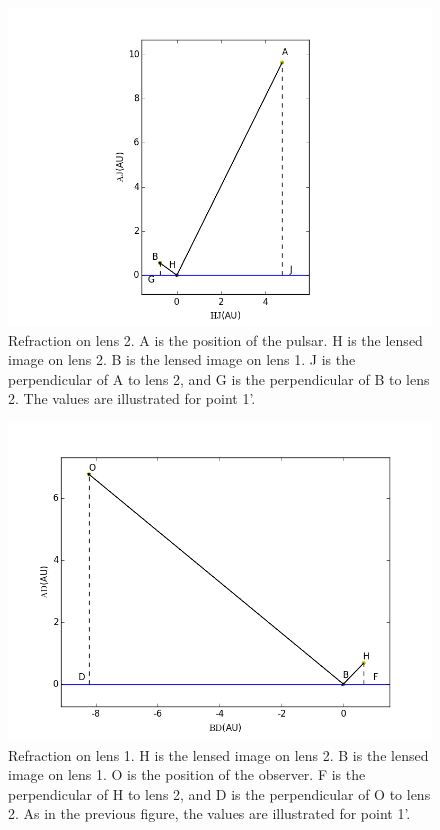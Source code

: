 \documentclass[useAMS,usenatbib]{mn2e}
\begin{document}
\begin{figure}
\centering
\includegraphics[width=1.0\linewidth,scale=1.0]{First_reflection.png}
\caption{Refraction on lens 2. 
A is the position of the pulsar. H is the lensed image on lens 2. B is
the lensed image on lens 1. J is the perpendicular of A to lens 2, and
G is the perpendicular of B to lens 2. The values are illustrated for point 1'.}
\label{first_reflect}
\end{figure}

\begin{figure}
\centering
\includegraphics[width=1.0\linewidth]{Second_reflection.png}
\caption{Refraction on lens 1. 
H is the lensed image on lens 2. B is the lensed image on lens 1. O is
the position of the observer. F is the perpendicular of H to lens 2,
and D is the perpendicular of O to lens 2. 
 As in the previous figure, the values are illustrated for point 1'. }
\label{second_reflect}
\end{figure}
\end{document}
